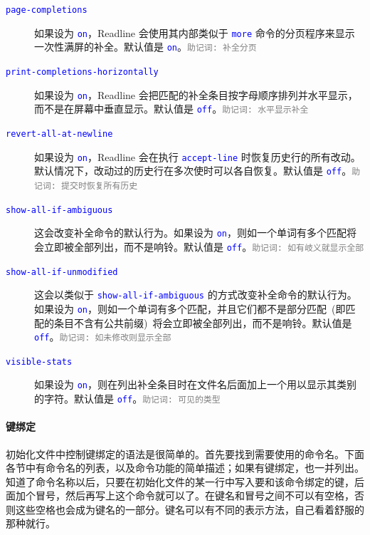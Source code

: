 \documentclass[openany,notitlepage]{book}
\newcommand{\mnemonic}[1]{\textcolor{gray}{{\scriptsize\tt 助记词: #1}}}
\newcommand{\code}[1]{\textcolor{blue}{{\tt #1}}}
\begin{document}
\begin{CJK}{UTF8}{song}
\begin{description}
\item[\code{page-completions}] 如果设为 \code{on}，Readline 会使用其内部类似于 \code{more} 命令的分页程序来显示一次性满屏的补全。默认值是 \code{on}。\mnemonic{补全分页}
\item[\code{print-completions-horizontally}] 如果设为 \code{on}，Readline 会把匹配的补全条目按字母顺序排列并水平显示，而不是在屏幕中垂直显示。默认值是 \code{off}。\mnemonic{水平显示补全}
\item[\code{revert-all-at-newline}] 如果设为 \code{on}，Readline 会在执行 \code{accept-line} 时恢复历史行的所有改动。默认情况下，改动过的历史行在多次使时可以各自恢复。默认值是 \code{off}。\mnemonic{提交时恢复所有历史}
\item[\code{show-all-if-ambiguous}] 这会改变补全命令的默认行为。如果设为 \code{on}，则如一个单词有多个匹配将会立即被全部列出，而不是响铃。默认值是 \code{off}。\mnemonic{如有岐义就显示全部}
\item[\code{show-all-if-unmodified}] 这会以类似于 \code{show-all-if-ambiguous} 的方式改变补全命令的默认行为。如果设为 \code{on}，则如一个单词有多个匹配，并且它们都不是部分匹配~(即匹配的条目不含有公共前缀)~将会立即被全部列出，而不是响铃。默认值是 \code{off}。\mnemonic{如未修改则显示全部}
\item[\code{visible-stats}] 如果设为 \code{on}，则在列出补全条目时在文件名后面加上一个用以显示其类别的字符。默认值是 \code{off}。\mnemonic{可见的类型}
\end{description}

\paragraph{键绑定} %
初始化文件中控制键绑定的语法是很简单的。首先要找到需要使用的命令名。下面各节中有命令名的列表，以及命令功能的简单描述；如果有键绑定，也一并列出。知道了命令名称以后，只要在初始化文件的某一行中写入要和该命令绑定的键，后面加个冒号，然后再写上这个命令就可以了。在键名和冒号之间不可以有空格，否则这些空格也会成为键名的一部分。键名可以有不同的表示方法，自己看着舒服的那种就行。


\end{CJK}
\end{document}
